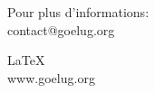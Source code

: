 \documentclass[a4paper]{scrartcl}
\begin{document}
\sffamily


	\begin{center}
	
		\vspace{32pt}

		
 	
 		\vspace{10pt}
		
	\end{center}






\begin{center}
\textsf{
	Pour plus d'informations: \\
	contact@goelug.org
}

\small{\LaTeX{} \\
\textsf{www.goelug.org}}
	
\end{center}
\end{document}
